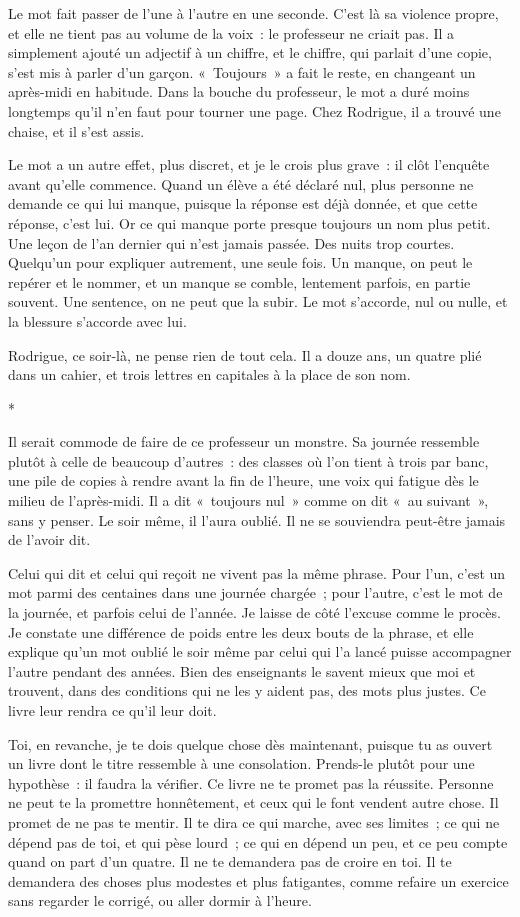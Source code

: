 \documentclass[10.5pt,twoside,openright]{book}
\newcommand{\asterisme}{\par\vspace{0.7em}\centerline{\color{gris}*\quad*\quad*}\vspace{0.7em}\par\noindent}
\begin{document}
Le mot fait passer de l’une à l’autre en une seconde. C’est là sa violence propre, et elle ne tient pas au volume de la voix : le professeur ne criait pas. Il a simplement ajouté un adjectif à un chiffre, et le chiffre, qui parlait d’une copie, s’est mis à parler d’un garçon. « Toujours » a fait le reste, en changeant un après-midi en habitude. Dans la bouche du professeur, le mot a duré moins longtemps qu’il n’en faut pour tourner une page. Chez Rodrigue, il a trouvé une chaise, et il s’est assis.

Le mot a un autre effet, plus discret, et je le crois plus grave : il clôt l’enquête avant qu’elle commence. Quand un élève a été déclaré nul, plus personne ne demande ce qui lui manque, puisque la réponse est déjà donnée, et que cette réponse, c’est lui. Or ce qui manque porte presque toujours un nom plus petit. Une leçon de l’an dernier qui n’est jamais passée. Des nuits trop courtes. Quelqu’un pour expliquer autrement, une seule fois. Un manque, on peut le repérer et le nommer, et un manque se comble, lentement parfois, en partie souvent. Une sentence, on ne peut que la subir. Le mot s’accorde, nul ou nulle, et la blessure s’accorde avec lui.

Rodrigue, ce soir-là, ne pense rien de tout cela. Il a douze ans, un quatre plié dans un cahier, et trois lettres en capitales à la place de son nom.

\asterisme

Il serait commode de faire de ce professeur un monstre. Sa journée ressemble plutôt à celle de beaucoup d’autres : des classes où l’on tient à trois par banc, une pile de copies à rendre avant la fin de l’heure, une voix qui fatigue dès le milieu de l’après-midi. Il a dit « toujours nul » comme on dit « au suivant », sans y penser. Le soir même, il l’aura oublié. Il ne se souviendra peut-être jamais de l’avoir dit.

Celui qui dit et celui qui reçoit ne vivent pas la même phrase. Pour l’un, c’est un mot parmi des centaines dans une journée chargée ; pour l’autre, c’est le mot de la journée, et parfois celui de l’année. Je laisse de côté l’excuse comme le procès. Je constate une différence de poids entre les deux bouts de la phrase, et elle explique qu’un mot oublié le soir même par celui qui l’a lancé puisse accompagner l’autre pendant des années. Bien des enseignants le savent mieux que moi et trouvent, dans des conditions qui ne les y aident pas, des mots plus justes. Ce livre leur rendra ce qu’il leur doit.

Toi, en revanche, je te dois quelque chose dès maintenant, puisque tu as ouvert un livre dont le titre ressemble à une consolation. Prends-le plutôt pour une hypothèse : il faudra la vérifier. Ce livre ne te promet pas la réussite. Personne ne peut te la promettre honnêtement, et ceux qui le font vendent autre chose. Il promet de ne pas te mentir. Il te dira ce qui marche, avec ses limites ; ce qui ne dépend pas de toi, et qui pèse lourd ; ce qui en dépend un peu, et ce peu compte quand on part d’un quatre. Il ne te demandera pas de croire en toi. Il te demandera des choses plus modestes et plus fatigantes, comme refaire un exercice sans regarder le corrigé, ou aller dormir à l’heure.
\end{document}
